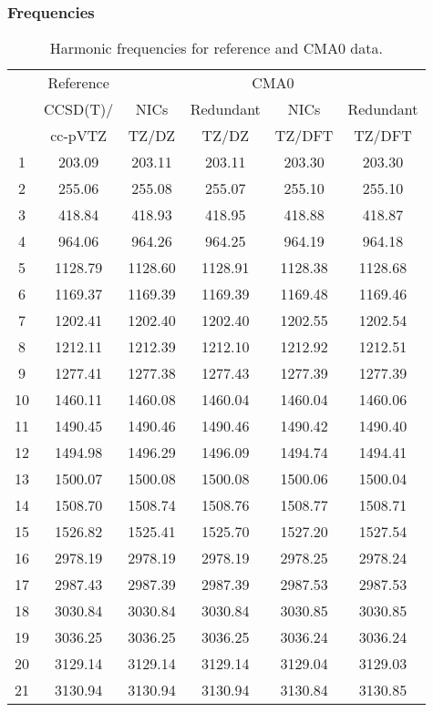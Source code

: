 \documentclass[10pt,oneside]{article}
\begin{document}
\begin{table}[h!]
\subsubsection*{Frequencies}
\centering
\caption{Harmonic frequencies for reference and CMA0 data.}
\begin{tabular}{cccccc}
\toprule
{} & Reference & \multicolumn{4}{c}{CMA0} \\
{} &  CCSD(T)/ &    NICs &  Redundant &    NICs & Redundant \\
{} &   cc-pVTZ &   TZ/DZ &      TZ/DZ &  TZ/DFT &    TZ/DFT \\
\midrule
1  &    203.09 &  203.11 &     203.11 &  203.30 &    203.30 \\
2  &    255.06 &  255.08 &     255.07 &  255.10 &    255.10 \\
3  &    418.84 &  418.93 &     418.95 &  418.88 &    418.87 \\
4  &    964.06 &  964.26 &     964.25 &  964.19 &    964.18 \\
5  &   1128.79 & 1128.60 &    1128.91 & 1128.38 &   1128.68 \\
6  &   1169.37 & 1169.39 &    1169.39 & 1169.48 &   1169.46 \\
7  &   1202.41 & 1202.40 &    1202.40 & 1202.55 &   1202.54 \\
8  &   1212.11 & 1212.39 &    1212.10 & 1212.92 &   1212.51 \\
9  &   1277.41 & 1277.38 &    1277.43 & 1277.39 &   1277.39 \\
10 &   1460.11 & 1460.08 &    1460.04 & 1460.04 &   1460.06 \\
11 &   1490.45 & 1490.46 &    1490.46 & 1490.42 &   1490.40 \\
12 &   1494.98 & 1496.29 &    1496.09 & 1494.74 &   1494.41 \\
13 &   1500.07 & 1500.08 &    1500.08 & 1500.06 &   1500.04 \\
14 &   1508.70 & 1508.74 &    1508.76 & 1508.77 &   1508.71 \\
15 &   1526.82 & 1525.41 &    1525.70 & 1527.20 &   1527.54 \\
16 &   2978.19 & 2978.19 &    2978.19 & 2978.25 &   2978.24 \\
17 &   2987.43 & 2987.39 &    2987.39 & 2987.53 &   2987.53 \\
18 &   3030.84 & 3030.84 &    3030.84 & 3030.85 &   3030.85 \\
19 &   3036.25 & 3036.25 &    3036.25 & 3036.24 &   3036.24 \\
20 &   3129.14 & 3129.14 &    3129.14 & 3129.04 &   3129.03 \\
21 &   3130.94 & 3130.94 &    3130.94 & 3130.84 &   3130.85 \\
\bottomrule
\end{tabular}
\end{table}
\end{document}
